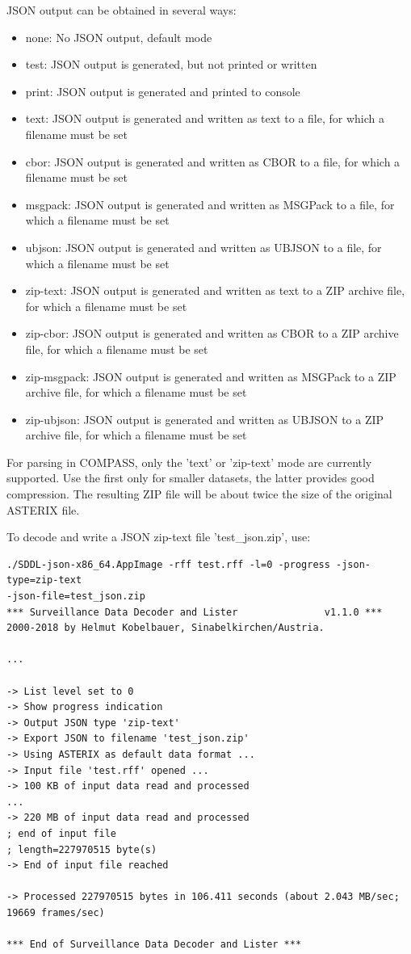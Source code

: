 JSON output can be obtained in several ways:
\begin{itemize}
\item none: No JSON output, default mode
\item test: JSON output is generated, but not printed or written
\item print: JSON output is generated and printed to console
\item text: JSON output is generated and written as text to a file, for which a filename must be set
\item cbor: JSON output is generated and written as CBOR to a file, for which a filename must be set
\item msgpack: JSON output is generated and written as MSGPack to a file, for which a filename must be set
\item ubjson: JSON output is generated and written as UBJSON to a file, for which a filename must be set
\item zip-text: JSON output is generated and written as text to a ZIP archive file, for which a filename must be set
\item zip-cbor: JSON output is generated and written as CBOR to a ZIP archive file, for which a filename must be set
\item zip-msgpack: JSON output is generated and written as MSGPack to a ZIP archive file, for which a filename must be set
\item zip-ubjson: JSON output is generated and written as UBJSON to a ZIP archive file, for which a filename must be set
\end{itemize}

For parsing in COMPASS, only the 'text' or 'zip-text' mode are currently supported. Use the first only for smaller datasets, the latter provides good compression. The resulting ZIP file will be about twice the size of the original ASTERIX file.

To decode and write a JSON zip-text file 'test\_json.zip', use:
\begin{lstlisting}
./SDDL-json-x86_64.AppImage -rff test.rff -l=0 -progress -json-type=zip-text 
-json-file=test_json.zip
*** Surveillance Data Decoder and Lister			   v1.1.0 ***
2000-2018 by Helmut Kobelbauer, Sinabelkirchen/Austria.

...

-> List level set to 0
-> Show progress indication
-> Output JSON type 'zip-text'
-> Export JSON to filename 'test_json.zip'
-> Using ASTERIX as default data format ...
-> Input file 'test.rff' opened ...
-> 100 KB of input data read and processed
...
-> 220 MB of input data read and processed
; end of input file
; length=227970515 byte(s)
-> End of input file reached

-> Processed 227970515 bytes in 106.411 seconds (about 2.043 MB/sec; 19669 frames/sec)

*** End of Surveillance Data Decoder and Lister ***
\end{lstlisting}


